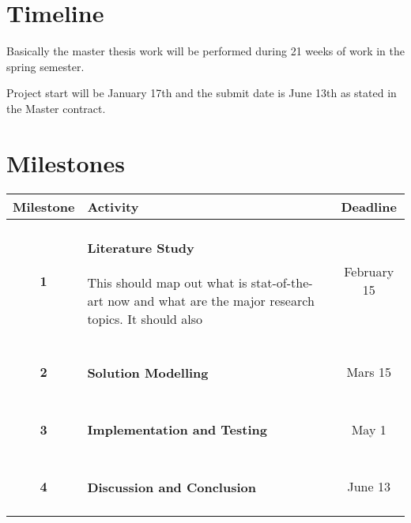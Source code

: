 \documentclass[a4paper, 10pt]{article}
\begin{document}
\section{Timeline}
Basically the master thesis work will be performed during 21 weeks of work in the spring
semester. 

Project start will be January 17th and the submit date is June 13th as stated in the
Master contract. 


\section{Milestones}

\begin{tabular}{| c | p{11.5cm} || c |}
    \hline
        Milestone   &   Activity    &   Deadline \\
    \hline
    \hline
        \textbf{1}  &   \paragraph{Literature Study} This should map out what is
                        stat-of-the-art now and what are the major research topics.
                        It should also 
                                    & February 15 \\
        \hline
        \textbf{2}  &   \paragraph{Solution Modelling}  
                                    
                                    & Mars 15 \\
        \hline
        \textbf{3}  &   \paragraph{Implementation and Testing} 

                                    & May 1 \\
        \hline
        \textbf{4}  &   \paragraph{Discussion and Conclusion}
            
                                    & June 13 \\

    \hline
\end{tabular}
\end{document}
